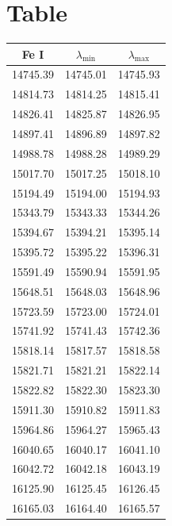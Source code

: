 \documentclass{article}
\begin{document}
\section{Table}
\begin{table}[h!]
  \vspace{0.3cm}
  \begin{minipage}[t]{.4\linewidth}
  \begin{center}
    \begin{tabular}{ccc}
          \hline
      \hline
      Fe I & $\lambda_{\mathrm{min}}$ & $\lambda_{\mathrm{max}}$ \\
      \hline
          14745.39 & 14745.01 & 14745.93 \\
          14814.73 & 14814.25 & 14815.41 \\
          14826.41 & 14825.87 & 14826.95 \\
          14897.41 & 14896.89 & 14897.82 \\
          14988.78 & 14988.28 & 14989.29 \\
          15017.70 & 15017.25 & 15018.10 \\
          15194.49 & 15194.00 & 15194.93 \\
          15343.79 & 15343.33 & 15344.26 \\
          15394.67 & 15394.21 & 15395.14 \\
          15395.72 & 15395.22 & 15396.31 \\
          15591.49 & 15590.94 & 15591.95 \\
          15648.51 & 15648.03 & 15648.96 \\
          15723.59 & 15723.00 & 15724.01 \\
          15741.92 & 15741.43 & 15742.36 \\
          15818.14 & 15817.57 & 15818.58 \\
          15821.71 & 15821.21 & 15822.14 \\
          15822.82 & 15822.30 & 15823.30 \\
          15911.30 & 15910.82 & 15911.83 \\
          15964.86 & 15964.27 & 15965.43 \\
          16040.65 & 16040.17 & 16041.10 \\
          16042.72 & 16042.18 & 16043.19 \\
          16125.90 & 16125.45 & 16126.45 \\
          16165.03 & 16164.40 & 16165.57 \\

\end{tabular}
\end{center}
\end{minipage}
\end{table}
\end{document}
